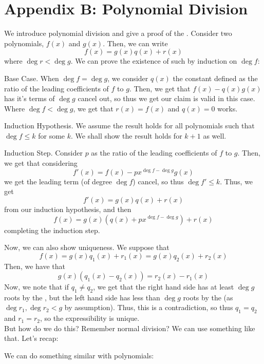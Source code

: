 \documentclass[11pt,titlepage]{scrartcl}
\begin{document}
\section{Appendix B: Polynomial Division}\label{appb}
We introduce polynomial division and give a proof of the . Consider two polynomials, $f(x)$ and $g(x)$. Then, we can write
\[f(x)=g(x)q(x)+r(x)\]
where $\deg r<\deg g$. We can prove the existence of such by induction on $\deg f$:
\begin{induction_snippet}{Base Case.}
When $\deg f=\deg g$, we consider $q(x)$ the constant defined as the ratio of the leading coefficients of $f$ to $g$. Then, we get that $f(x)-q(x)g(x)$ has it's terms of $\deg g$ cancel out, so thus we get our claim is valid in this case. Where $\deg f<\deg g$, we get that $r(x)=f(x)$ and $q(x)=0$ works.
\end{induction_snippet}
\begin{induction_snippet}{Induction Hypothesis.}
We assume the result holds for all polynomials such that $\deg f\leq k$ for some $k$. We shall show the result holds for $k+1$ as well.
\end{induction_snippet}
\begin{induction_snippet}{Induction Step.}
Consider $p$ as the ratio of the leading coefficients of $f$ to $g$. Then, we get that considering
\[f'(x)=f(x)-px^{\deg f-\deg g}g(x)\]
we get the leading term (of degree $\deg f$) cancel, so thus $\deg f'\leq k$. Thus, we get
\[f'(x)=g(x)q(x)+r(x)\]
from our induction hypothesis, and then
\[f(x)=g(x)(q(x)+px^{\deg f-\deg g})+r(x)\]
completing the induction step.
\end{induction_snippet}
Now, we can also show uniqueness. We suppose that
\[f(x)=g(x)q_1(x)+r_1(x)=g(x)q_2(x)+r_2(x)\]
Then, we have that
\[g(x)(q_1(x)-q_2(x))=r_2(x)-r_1(x)\]
Now, we note that if $q_1\neq q_2$, we get that the right hand side has at least $\deg g$ roots by the , but the left hand side has less than $\deg g$ roots by the  (as $\deg r_1,\deg r_2<g$ by assumption). Thus, this is a contradiction, so thus $q_1=q_2$ and $r_1=r_2$, so the expressibility is unique.\\[2\baselineskip]
But how do we do this? Remember normal division? We can use something like that. Let's recap:
\begin{center}\end{center}
We can do something similar with polynomials:
\begin{center}\end{center}
\end{document}

